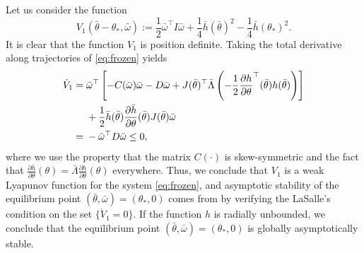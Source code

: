 \documentclass{ifacconf}
\begin{document}
Let us consider the function
\begin{equation}
	V_1(\bar{\theta}-\theta_*,\bar{\omega}):=\frac{1}{2}\bar{\omega}^\top I \bar{\omega} + \frac{1}{4}\bar{h}(\bar{\theta})^2 -  \frac{1}{4}\bar{h}(\theta_*)^2.
\end{equation}
It is clear that the function $V_1$ is position definite. Taking the total derivative along trajectories of \eqref{eq:frozen} yields
\begin{align}
	\dot{V}_1=\;&\bar{\omega}^\top\left[-C(\bar{\omega})\bar{\omega}-D\bar{\omega}+J(\bar{\theta})^\top \bar{\Lambda}\left(-\frac{1}{2}\frac{\partial h}{\partial \theta}^\top(\bar{\theta}) h(\bar{\theta})\right)\right] \notag \\
	& +\frac{1}{2}\bar{h}(\bar{\theta})\frac{\partial \bar{h}}{\partial \theta}(\bar{\theta})J(\bar{\theta})\bar{\omega} \notag\\
	=\;& -\bar{\omega}^\top D \bar{\omega}\le 0, 
\end{align} 
 where we use the property that the matrix $C(\cdot)$ is skew-symmetric and the fact that $\frac{\partial \bar{h}}{\partial \theta}(\theta)=\bar{\Lambda}\frac{\partial h}{\partial \theta}(\theta)$ everywhere. Thus, we conclude that $V_1$ is a weak Lyapunov function for the system \eqref{eq:frozen}, and asymptotic stability of the equilibrium point $(\bar{\theta},\bar{\omega})=(\theta_*,0)$ comes from by verifying the LaSalle's condition on the set $\{\dot{V}_1=0\}$. If the function $h$ is radially unbounded, we conclude that the equilibrium point $(\bar{\theta},\bar{\omega})=(\theta_*,0)$ is globally asymptotically stable.
 
\end{document}
